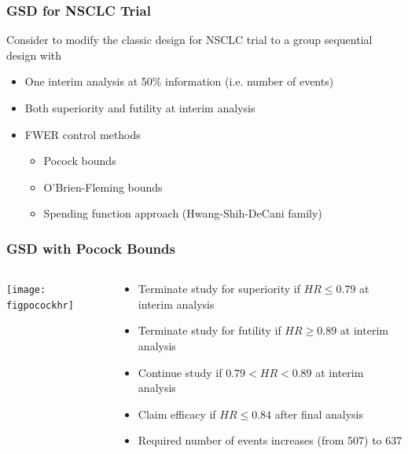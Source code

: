 \documentclass{beamer}
\begin{document}
\begin{frame}
	\frametitle{GSD for NSCLC Trial}
Consider to modify the classic design for NSCLC trial to a group sequential design with \begin{itemize}
		\item One interim analysis at 50\% information (i.e. number of events)
		\item Both superiority and futility at interim analysis
		\item FWER control methods \begin{itemize}
		\item Pocock bounds
		\item O'Brien-Fleming bounds
		\item Spending function approach (Hwang-Shih-DeCani family)
	\end{itemize}
\end{itemize}	
\end{frame}		
\begin{frame}
	\frametitle{GSD with Pocock Bounds}
\begin{columns}
	\begin{column}{0.48\textwidth}
	\texttt{[image: figpocockhr]} 
	\end{column}
	\begin{column}{0.48\textwidth} \begin{itemize}
	  \item Terminate study for superiority if $HR \leq 0.79$ at interim analysis
	  \item Terminate study for futility if $HR\geq 0.89 $ at interim analysis
	  \item Continue study if $ 0.79 < HR < 0.89 $ at interim analysis
	  \item Claim efficacy if $HR \leq 0.84$ after final analysis
	  \item Required number of events increases (from 507) to 637 
	  \end{itemize}
	\end{column}
\end{columns}	
\end{frame}
\end{document}

